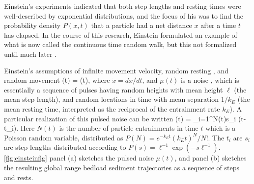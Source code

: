Einstein's experiments indicated that both step lengths and resting times were well-described by exponential distributions, and the focus of his \DIFdelbegin {}\DIFdelend \DIFaddbegin {}\DIFaddend was to find the probability density $P(x,t)$ that a particle had \DIFdelbegin {}\DIFdelend \DIFaddbegin {}\DIFaddend a net distance $x$ after a time $t$ has elapsed. In the course of this research, Einstein formulated an example of what is now called the continuous time random walk, but this \DIFdelbegin {}\DIFdelend \DIFaddbegin {}\DIFaddend not formalized until much later \citep{Montroll1965}. \DIFaddbegin {}\DIFaddend 

Einstein's assumptions \DIFdelbegin {}\DIFdelend of infinite movement velocity, random resting \DIFdelbegin {}\DIFdelend \DIFaddbegin {}\DIFaddend , and random movement \DIFdelbegin {}\DIFdelend \DIFaddbegin {}\DIFaddend \be {}(t) = \mu(t), \label{eq:einlangevin}\ee
where $\dot{x} = dx/dt$, and $\mu(t)$ is a \DIFdelbegin {}\DIFdelend \DIFaddbegin {}\DIFaddend noise \citep{VanDenBroeck1983}, which is essentially a sequence of pulses having random heights with mean height $\ell$ (the mean step length), and random locations in time with mean separation $1/k_E$ (the mean resting time, interpreted as the reciprocal of the entrainment rate $k_E$).
A particular realization of this pulsed noise can be written
\be \mu(t) = \sum_{i=1}^{N(t)}s_i \delta(t-t_i). \label{eq:einrando} \ee
Here $N(t)$ is the number of particle entrainments in time $t$ which is a Poisson random variable, distributed as $P(N) = e^{-k_E t} (k_E t)^N/N!$. The $t_i$ are \DIFdelbegin {}\DIFdelend \DIFaddbegin {}\DIFaddend $s_i$ are step lengths distributed according to $P(s) = \ell^{-1}\exp(-s \ell^{-1}).$
\DIFdelbegin {}\DIFdelend \DIFaddbegin {}\DIFaddend \ref{fig:einsteinfig} panel (a) sketches the pulsed noise $\mu(t)$, and panel (b) sketches the resulting global range bedload sediment trajectories as a sequence of steps and rests.

